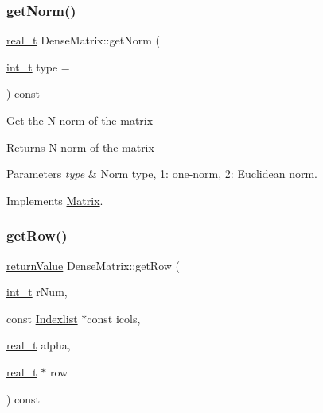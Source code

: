 \subsubsection{\texorpdfstring{get\+Norm()}{getNorm()}}
{\footnotesize\ttfamily \hyperlink{qp_o_a_s_e_s__wrapper_8h_a0d00e2b3dfadee81331bbb39068570c4}{real\+\_\+t} Dense\+Matrix\+::get\+Norm (\begin{DoxyParamCaption}\item[{\hyperlink{_types_8hpp_ab6fd6105e64ed14a0c9281326f05e623}{int\+\_\+t}}]{type = {} }\end{DoxyParamCaption}) const\hspace{0.3cm}{\ttfamily [virtual]}}

Get the N-\/norm of the matrix \begin{DoxyReturn}{Returns}
N-\/norm of the matrix 
\end{DoxyReturn}

\begin{DoxyParams}{Parameters}
{\em type} & Norm type, 1\+: one-\/norm, 2\+: Euclidean norm. \\
\hline
\end{DoxyParams}


Implements \hyperlink{class_matrix_a8d906c25118e71467aba6434612504b2}{Matrix}.

\mbox{\label{class_dense_matrix_adcc317510b74c2e21487816ae67a3bb4}} 
\subsubsection{\texorpdfstring{get\+Row()}{getRow()}}
{\footnotesize\ttfamily \hyperlink{_message_handling_8hpp_a81d556f613bfbabd0b1f9488c0fa865e}{return\+Value} Dense\+Matrix\+::get\+Row (\begin{DoxyParamCaption}\item[{\hyperlink{_types_8hpp_ab6fd6105e64ed14a0c9281326f05e623}{int\+\_\+t}}]{r\+Num,  }\item[{const \hyperlink{class_indexlist}{Indexlist} $\ast$const}]{icols,  }\item[{\hyperlink{qp_o_a_s_e_s__wrapper_8h_a0d00e2b3dfadee81331bbb39068570c4}{real\+\_\+t}}]{alpha,  }\item[{\hyperlink{qp_o_a_s_e_s__wrapper_8h_a0d00e2b3dfadee81331bbb39068570c4}{real\+\_\+t} $\ast$}]{row }\end{DoxyParamCaption}) const\hspace{0.3cm}{\ttfamily [virtual]}}

